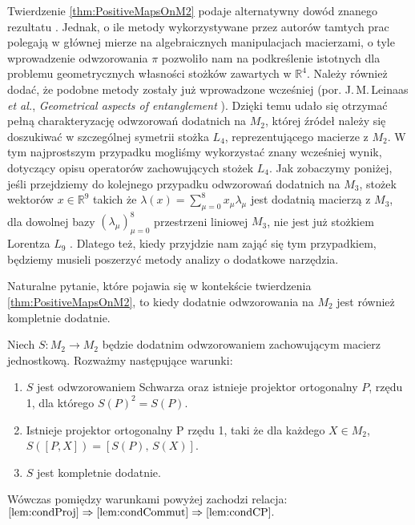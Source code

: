 Twierdzenie \ref{thm:PositiveMapsOnM2} podaje alternatywny dowód
znanego rezultatu \cite{stormer1963positive, woronowicz1976positive}.
Jednak, o ile metody wykorzystywane przez autorów tamtych prac
polegają w głównej mierze na algebraicznych manipulacjach macierzami,
o tyle wprowadzenie odwzorowania $\pi$ pozwoliło nam
na podkreślenie istotnych dla problemu geometrycznych własności stożków
zawartych w  $\mathbb{R}^{4}$.
Należy również dodać, że podobne metody zostały już wprowadzone wcześniej
(por. J.\,M.\,Leinaas \emph{et al.}, \emph{Geometrical aspects of entanglement}
\cite{leinaas2006geometrical}).
Dzięki temu udało się otrzymać pełną charakteryzację odwzorowań dodatnich
na $M_{2}$,
której źródeł należy się doszukiwać w szczególnej symetrii stożka
$L_{4}$, reprezentującego macierze z $M_{2}$.
W tym najprostszym przypadku mogliśmy wykorzystać znany wcześniej
\cite{loewy1975positive} wynik, dotyczący
opisu operatorów zachowujących stożek $L_{4}$.
Jak zobaczymy poniżej, jeśli przejdziemy do kolejnego przypadku
odwzorowań dodatnich na $M_{3}$,
stożek wektorów $x \in \mathbb{R}^{9}$ takich że
$\lambda(x) =  \sum_{\mu=0}^{8} x_{\mu} \lambda_{\mu}$
jest dodatnią macierzą z $M_{3}$,
dla dowolnej bazy $(\lambda_{\mu})_{\mu=0}^{8}$ przestrzeni liniowej $M_{3}$,
nie jest już stożkiem Lorentza $L_{9}$ \cite{goyal2011geometry}.
Dlatego też, kiedy przyjdzie nam zająć się tym przypadkiem,
będziemy musieli poszerzyć metody analizy o dodatkowe narzędzia.


Naturalne pytanie, które pojawia się w kontekście
twierdzenia \ref{thm:PositiveMapsOnM2},
to kiedy dodatnie odwzorowania na $M_{2}$ jest również kompletnie dodatnie.

\begin{Theorem}
\label{thm:MapsPreservingIdentity}
Niech $S: M_{2} \rightarrow M_{2}$ będzie dodatnim odwzorowaniem zachowującym
macierz jednostkową. Rozważmy następujące warunki:
\begin{enumerate}

\item
\label{lem:condProj}
$S$ jest odwzorowaniem Schwarza oraz istnieje projektor ortogonalny $P$, rzędu 1, dla którego $S(P)^{2} = S(P)$.

\item
\label{lem:condCommut}
Istnieje projektor ortogonalny P rzędu 1, taki że dla każdego $X \in M_{2}$,
$S([P,X]) = [S(P), \, S(X)]$.

\item
\label{lem:condCP}
$S$ jest kompletnie dodatnie.
\end{enumerate}
Wówczas pomiędzy warunkami powyżej zachodzi relacja:
$
\ref{lem:condProj} \Rightarrow
    \ref{lem:condCommut} \Rightarrow \ref{lem:condCP}.
$
\end{Theorem}

